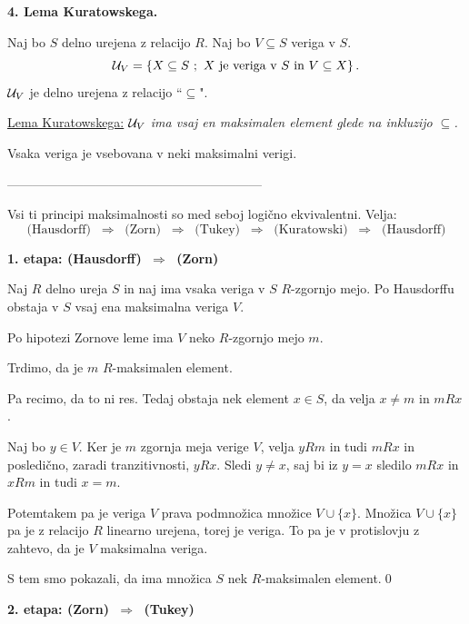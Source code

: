 \documentclass[11pt,paper=b5,footinclude,headinclude]{scrbook} %
\def\sledi {{~\Rightarrow~}}
\begin{document}
\textbf{4. Lema Kuratowskega.}

Naj bo $S$ delno urejena z relacijo $R$. Naj bo $V\subseteq S$ veriga v $S$.
$${\cal U}_V = \{X\subseteq S~;~X\textrm{ je veriga v }S \textrm{ in } V\subseteq X\}\,.$$
${\cal U}_V$ je delno urejena z relacijo ``$\subseteq$".

\underline{Lema Kuratowskega:}
{\em ${\cal U}_V$ ima vsaj en maksimalen element glede na inkluzijo $\subseteq$.}

\medskip
Vsaka veriga je vsebovana v neki maksimalni verigi.

------------------------------------------------------------

\bigskip

Vsi ti principi maksimalnosti so med seboj logično ekvivalentni.
Velja:
$$\textrm{(Hausdorff) $\sledi$ (Zorn) $\sledi$ (Tukey) $\sledi$ (Kuratowski) $\sledi$ (Hausdorff)}$$

\bigskip
\textbf{1. etapa: (Hausdorff) $\sledi$ (Zorn)}

Naj $R$ delno ureja $S$ in naj ima vsaka veriga v $S$ $R$-zgornjo mejo.
Po Hausdorffu obstaja v $S$ vsaj ena maksimalna veriga $V$.

Po hipotezi Zornove leme ima $V$ neko $R$-zgornjo mejo $m$.

Trdimo, da je $m$ $R$-maksimalen element.

Pa recimo, da to ni res. Tedaj obstaja nek element $x\in S$, da velja $x\neq m$ in $mRx$.

Naj bo $y\in V$. Ker je $m$ zgornja meja verige $V$, velja $yRm$ in tudi $mRx$ in
posledično, zaradi tranzitivnosti, $yRx$. Sledi $y\neq x$, saj bi iz $y=x$ sledilo $mRx$ in $xRm$ in tudi $x = m$.

Potemtakem pa je veriga $V$ prava podmnožica množice $V\cup \{x\}$. Množica $V\cup \{x\}$ pa je z relacijo $R$ linearno urejena, torej je veriga. To pa je v protislovju z zahtevo, da je $V$ maksimalna veriga.

S tem smo pokazali, da ima množica $S$ nek $R$-maksimalen element.\qed

%
%
%
%
%
\bigskip
\textbf{2. etapa: (Zorn) $\sledi$ (Tukey)}
\end{document}
